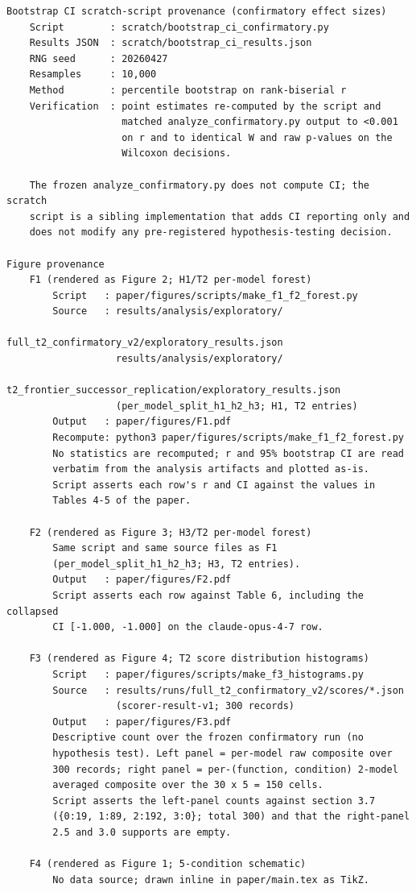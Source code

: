 \begin{verbatim}
Bootstrap CI scratch-script provenance (confirmatory effect sizes)
    Script        : scratch/bootstrap_ci_confirmatory.py
    Results JSON  : scratch/bootstrap_ci_results.json
    RNG seed      : 20260427
    Resamples     : 10,000
    Method        : percentile bootstrap on rank-biserial r
    Verification  : point estimates re-computed by the script and
                    matched analyze_confirmatory.py output to <0.001
                    on r and to identical W and raw p-values on the
                    Wilcoxon decisions.

    The frozen analyze_confirmatory.py does not compute CI; the scratch
    script is a sibling implementation that adds CI reporting only and
    does not modify any pre-registered hypothesis-testing decision.

Figure provenance
    F1 (rendered as Figure 2; H1/T2 per-model forest)
        Script   : paper/figures/scripts/make_f1_f2_forest.py
        Source   : results/analysis/exploratory/
                       full_t2_confirmatory_v2/exploratory_results.json
                   results/analysis/exploratory/
                       t2_frontier_successor_replication/exploratory_results.json
                   (per_model_split_h1_h2_h3; H1, T2 entries)
        Output   : paper/figures/F1.pdf
        Recompute: python3 paper/figures/scripts/make_f1_f2_forest.py
        No statistics are recomputed; r and 95% bootstrap CI are read
        verbatim from the analysis artifacts and plotted as-is.
        Script asserts each row's r and CI against the values in
        Tables 4-5 of the paper.

    F2 (rendered as Figure 3; H3/T2 per-model forest)
        Same script and same source files as F1
        (per_model_split_h1_h2_h3; H3, T2 entries).
        Output   : paper/figures/F2.pdf
        Script asserts each row against Table 6, including the collapsed
        CI [-1.000, -1.000] on the claude-opus-4-7 row.

    F3 (rendered as Figure 4; T2 score distribution histograms)
        Script   : paper/figures/scripts/make_f3_histograms.py
        Source   : results/runs/full_t2_confirmatory_v2/scores/*.json
                   (scorer-result-v1; 300 records)
        Output   : paper/figures/F3.pdf
        Descriptive count over the frozen confirmatory run (no
        hypothesis test). Left panel = per-model raw composite over
        300 records; right panel = per-(function, condition) 2-model
        averaged composite over the 30 x 5 = 150 cells.
        Script asserts the left-panel counts against section 3.7
        ({0:19, 1:89, 2:192, 3:0}; total 300) and that the right-panel
        2.5 and 3.0 supports are empty.

    F4 (rendered as Figure 1; 5-condition schematic)
        No data source; drawn inline in paper/main.tex as TikZ.
\end{verbatim}
